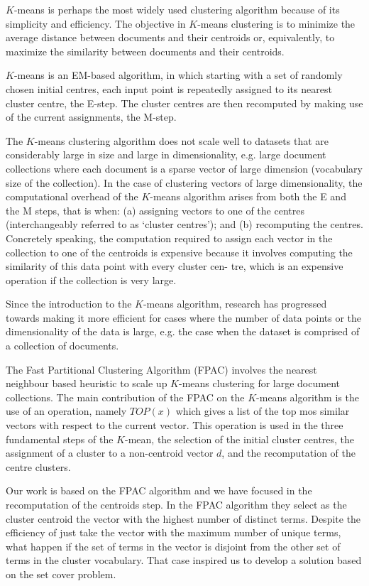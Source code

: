\documentclass[runningheads]{llncs}
\begin{document}
$K$-means is perhaps the most widely used clustering algorithm
because of its simplicity and efficiency. The objective in $K$-means clustering is to minimize the average distance between documents and their
centroids or, equivalently, to maximize the similarity between documents
and their centroids.

$K$-means is an EM-based algorithm, in which starting with a set of randomly 
chosen initial centres, each input point is repeatedly assigned to its
nearest cluster centre, the E-step. The cluster centres are then recomputed by making use of the current assignments, the M-step.


The $K$-means clustering algorithm
does not scale well to datasets that are considerably large in size
and large in dimensionality, e.g. large document collections where
each document is a sparse vector of large dimension (vocabulary
size of the collection).
In the case of clustering vectors of large
dimensionality, the computational overhead of the $K$-means algorithm arises from both the E and the M steps, that is when: (a)
assigning vectors to one of the centres (interchangeably referred to
as ‘cluster centres’); and (b) recomputing the centres. Concretely
speaking, the computation required to assign each vector in the
collection to one of the centroids is expensive because it involves
computing the similarity of this data point with every cluster cen-
tre, which is an expensive operation if the collection is very large.

Since the introduction to the $K$-means algorithm, research
has progressed towards making it more efficient for cases where
the number of data points or the dimensionality of the data is
large, e.g. the case when the dataset is comprised of a collection
of documents.

The Fast Partitional Clustering Algorithm (FPAC) \cite{ganguly_2018}
involves the nearest neighbour based heuristic to
scale up $K$-means clustering for large document collections.
The main contribution of the FPAC on the $K$-means algorithm
is the use of an operation, namely $TOP(x)$ which gives a list
of the top mos similar vectors with respect to the current vector.
This operation is used in the three fundamental steps of the 
$K$-mean, the selection of the initial cluster centres,
the assignment of a cluster to a non-centroid vector $d$, and 
the recomputation of the centre clusters.

Our work is based on the FPAC algorithm and we have focused in the recomputation of the centroids step.
In the FPAC algorithm they select as the cluster centroid the 
vector with the highest number of distinct terms. Despite the efficiency
of just take the vector with the maximum number of unique terms,
what happen if the set of terms in the vector is disjoint from 
the other set of terms in the cluster vocabulary. That 
case inspired us to develop a solution based on the set cover problem.
\end{document}
